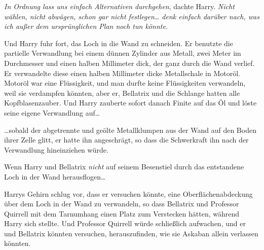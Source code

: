 \emph{In Ordnung lass uns einfach Alternativen} \emph{durchgehen}, dachte Harry. \emph{Nicht wählen, nicht abwägen, schon gar nicht festlegen… denk einfach darüber nach, was ich außer dem ursprünglichen Plan noch tun könnte.}

Und Harry fuhr fort, das Loch in die Wand zu schneiden. Er benutzte die partielle Verwandlung bei einem dünnen Zylinder aus Metall, zwei Meter im Durchmesser und einen halben Millimeter dick, der ganz durch die Wand verlief. Er verwandelte diese einen halben Millimeter dicke Metallschale in Motoröl. Motoröl war eine Flüssigkeit, und man durfte keine Flüssigkeiten verwandeln, weil sie verdampfen könnten, aber er, Bellatrix und die Schlange hatten alle Kopfblasenzauber. Und Harry zauberte sofort danach Finite auf das Öl und löste seine eigene Verwandlung auf…

…sobald der abgetrennte und geölte Metallklumpen aus der Wand auf den Boden ihrer Zelle glitt, er hatte ihn angeschrägt, so dass die Schwerkraft ihn nach der Verwandlung hineinziehen würde.

Wenn Harry und Bellatrix \emph{nicht} auf seinem Besenstiel durch das entstandene Loch in der Wand herausflogen…

Harrys Gehirn schlug vor, dass er versuchen könnte, eine Oberflächenabdeckung über dem Loch in der Wand zu verwandeln, so dass Bellatrix und Professor Quirrell mit dem Tarnumhang einen Platz zum Verstecken hätten, während Harry sich stellte. Und Professor Quirrell würde schließlich aufwachen, und er und Bellatrix könnten versuchen, herauszufinden, wie sie Askaban allein verlassen könnten.

